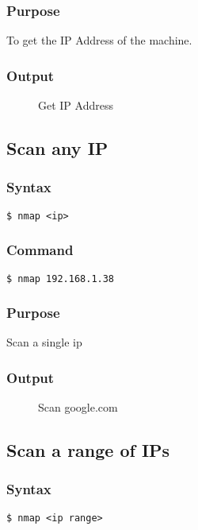 \documentclass[11pt]{article}
\begin{document}
\subsubsection*{Purpose}
To get the IP Address of the machine.

\subsubsection*{Output}
\begin{figure}[H]
    \centering
    \caption{Get IP Address}
    \label{fig:1}
\end{figure}

\subsection{Scan any IP}

\subsubsection{Syntax}
\begin{verbatim}
$ nmap <ip>
\end{verbatim}

\subsubsection*{Command}
\begin{verbatim}
$ nmap 192.168.1.38
\end{verbatim}

\subsubsection*{Purpose}
Scan a single ip

\subsubsection*{Output}
\begin{figure}[H]
    \centering
    \caption{Scan google.com}
    \label{fig:1}
\end{figure}

\subsection{Scan a range of IPs}

\subsubsection{Syntax}
\begin{verbatim}
$ nmap <ip range>
\end{verbatim}
\end{document}
